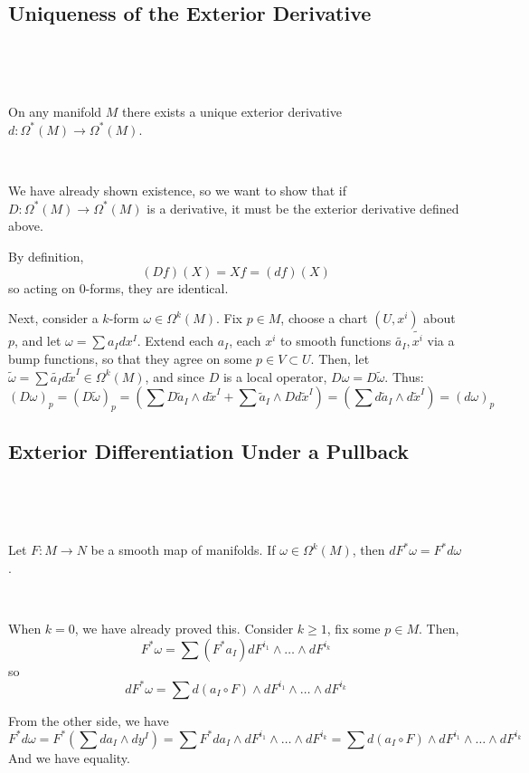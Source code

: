 \documentclass{article}
\begin{document}
\subsection{Uniqueness of the Exterior Derivative}
\

\begin{theorem}
  \

  On any manifold $M$ there exists a unique exterior derivative $d: \Omega^*(M) \to \Omega^*(M)$.
\end{theorem}

\begin{customproof}
  \

  We have already shown existence, so we want to show that if $D: \Omega^*(M) \to \Omega^*(M)$ is a derivative, it must be the exterior derivative defined above.

  By definition, $$(Df)(X) = Xf = (df)(X)$$so acting on $0$-forms, they are identical.

  Next, consider a $k$-form $\omega \in \Omega^k(M)$. Fix $p \in M$, choose a chart $(U, x^i)$ about $p$, and let $\omega = \sum a_Idx^I$. Extend each $a_I$, each $x^i$ to smooth functions $\tilde{a_I}, \tilde{x^i}$ via a bump functions, so that they agree on some $p \in V \subset U$. Then, let $\tilde{\omega} = \sum \tilde{a_I}d\tilde{x}^I \in \Omega^k(M)$, and since $D$ is a local operator, $D\omega = D\tilde{\omega}$. Thus: $$(D\omega)_p = (D\tilde{\omega})_p = (\sum D\tilde{a}_I \wedge d\tilde{x}^I + \sum \tilde{a}_I \wedge Dd\tilde{x}^I) = (\sum d\tilde{a}_I \wedge d\tilde{x}^I) = (d\omega)_p$$
\end{customproof}

\subsection{Exterior Differentiation Under a Pullback}
\

\begin{proposition}
  \

  Let $F: M \to N$ be a smooth map of manifolds. If $\omega \in \Omega^k(M)$, then $dF^*\omega = F^*d\omega$.
\end{proposition}

\begin{customproof}
  \

  When $k = 0$, we have already proved this. Consider $k\geq1$, fix some $p \in M$. Then, $$F^* \omega = \sum (F^*a_I)dF^{i_1} \wedge \dots \wedge dF^{i_k}$$so $$dF^*\omega = \sum d(a_I \circ F) \wedge dF^{i_1} \wedge \dots \wedge dF^{i_k}$$

  From the other side, we have $$
  F^* d\omega = F^*(\sum da_I \wedge dy^I) = \sum F^*da_I \wedge dF^{i_1} \wedge \dots \wedge dF^{i_k} = \sum d(a_I \circ F)\wedge dF^{i_1} \wedge \dots \wedge dF^{i_k}$$And we have equality.
\end{customproof}
\end{document}
